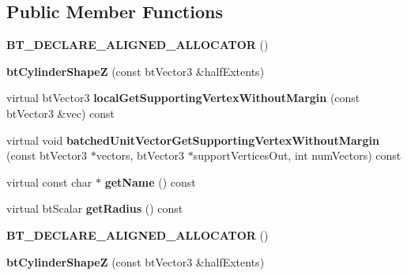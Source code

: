 \subsection*{Public Member Functions}
\begin{DoxyCompactItemize}
\item 
\mbox{\label{classbtCylinderShapeZ_a73e7d2fa2758c2ba0ca6534e6079cbbd}} 
{\bfseries B\+T\+\_\+\+D\+E\+C\+L\+A\+R\+E\+\_\+\+A\+L\+I\+G\+N\+E\+D\+\_\+\+A\+L\+L\+O\+C\+A\+T\+OR} ()
\item 
\mbox{\label{classbtCylinderShapeZ_ac26fdfc5964453cb832946225ff9432a}} 
{\bfseries bt\+Cylinder\+ShapeZ} (const bt\+Vector3 \&half\+Extents)
\item 
\mbox{\label{classbtCylinderShapeZ_aae95d1a7b650b3f8cb2e83b880fc76bc}} 
virtual bt\+Vector3 {\bfseries local\+Get\+Supporting\+Vertex\+Without\+Margin} (const bt\+Vector3 \&vec) const
\item 
\mbox{\label{classbtCylinderShapeZ_aa1a6e4b6b1e14d8586609571ae268e1d}} 
virtual void {\bfseries batched\+Unit\+Vector\+Get\+Supporting\+Vertex\+Without\+Margin} (const bt\+Vector3 $\ast$vectors, bt\+Vector3 $\ast$support\+Vertices\+Out, int num\+Vectors) const
\item 
\mbox{\label{classbtCylinderShapeZ_a9096086ff2a57b746121d6a2c5e662e6}} 
virtual const char $\ast$ {\bfseries get\+Name} () const
\item 
\mbox{\label{classbtCylinderShapeZ_a1a41d57ef826063714b724032d5db362}} 
virtual bt\+Scalar {\bfseries get\+Radius} () const
\item 
\mbox{\label{classbtCylinderShapeZ_a73e7d2fa2758c2ba0ca6534e6079cbbd}} 
{\bfseries B\+T\+\_\+\+D\+E\+C\+L\+A\+R\+E\+\_\+\+A\+L\+I\+G\+N\+E\+D\+\_\+\+A\+L\+L\+O\+C\+A\+T\+OR} ()
\item 
\mbox{\label{classbtCylinderShapeZ_ac26fdfc5964453cb832946225ff9432a}} 
{\bfseries bt\+Cylinder\+ShapeZ} (const bt\+Vector3 \&half\+Extents)
\item 
\mbox{\label{classbtCylinderShapeZ_ae389f47842a6a8a4872fd4855801fb3d}} 

\end{DoxyCompactItemize}

